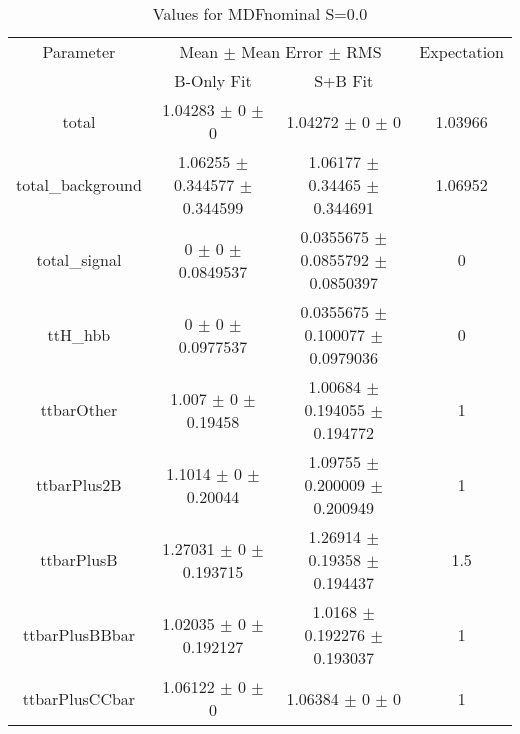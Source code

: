 \begin{table}
\centering
\caption{Values for MDFnominal S=0.0}
\begin{tabular}{cccc}
\toprule
Parameter & \multicolumn{2}{c}{Mean $\pm$ Mean Error $\pm$ RMS} & Expectation\\
 & B-Only Fit & S+B Fit & \\
\midrule
total & \num{1.04283} $\pm$ \num{0} $\pm$ \num{0} & \num{1.04272} $\pm$ \num{0} $\pm$ \num{0} & \num{1.03966}\\
total\_background & \num{1.06255} $\pm$ \num{0.344577} $\pm$ \num{0.344599} & \num{1.06177} $\pm$ \num{0.34465} $\pm$ \num{0.344691} & \num{1.06952}\\
total\_signal & \num{0} $\pm$ \num{0} $\pm$ \num{0.0849537} & \num{0.0355675} $\pm$ \num{0.0855792} $\pm$ \num{0.0850397} & \num{0}\\
ttH\_hbb & \num{0} $\pm$ \num{0} $\pm$ \num{0.0977537} & \num{0.0355675} $\pm$ \num{0.100077} $\pm$ \num{0.0979036} & \num{0}\\
ttbarOther & \num{1.007} $\pm$ \num{0} $\pm$ \num{0.19458} & \num{1.00684} $\pm$ \num{0.194055} $\pm$ \num{0.194772} & \num{1}\\
ttbarPlus2B & \num{1.1014} $\pm$ \num{0} $\pm$ \num{0.20044} & \num{1.09755} $\pm$ \num{0.200009} $\pm$ \num{0.200949} & \num{1}\\
ttbarPlusB & \num{1.27031} $\pm$ \num{0} $\pm$ \num{0.193715} & \num{1.26914} $\pm$ \num{0.19358} $\pm$ \num{0.194437} & \num{1.5}\\
ttbarPlusBBbar & \num{1.02035} $\pm$ \num{0} $\pm$ \num{0.192127} & \num{1.0168} $\pm$ \num{0.192276} $\pm$ \num{0.193037} & \num{1}\\
ttbarPlusCCbar & \num{1.06122} $\pm$ \num{0} $\pm$ \num{0} & \num{1.06384} $\pm$ \num{0} $\pm$ \num{0} & \num{1}\\
\bottomrule
\end{tabular}
\end{table}